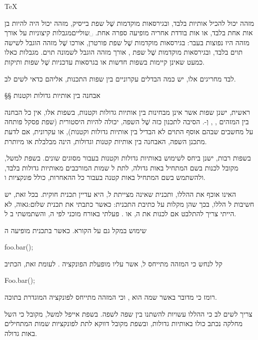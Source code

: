 \begin{english}
\TeX
\end{english}

 מזהה
יכול להכיל אותיות בלבד, ובגירסאות מוקדמות שֶׁל שפת בייסיק, מזהה יכול היה להיות
בן אות אחת בלבד, או אות בודדת אחריה מופיעה ספרה אחת.%
␣שוליים{מגבלות
  קיצוניות על אורך מזהה היו נפוצות בעבר: בגירסאות מוקדמות שֶׁל שפת פורטרן, אורכו שֶׁל
  מזהה הוגבל לשישה תוים בלבד, ובגירסאות מוקדמות שֶׁל שפת , אורך מזהה הוגבל
  לשמונה תוים. מגבלות כאלו כמעט שאינן קיימות בשפות חדשות או בגרסאות עדכניות שֶׁל
שפות ותיקות.}

לבד מחריגים אלו, יש כמה הבדלים עקרוניים בין שפות התכנות, אליהם כדאי לשים לב.

§§ אבחנה בין אותיות גדולות וקטנות

ראשית, ישנן שפות אשר אינן מבחינות בין אותיות גדולות וקטנות, בשפות אלו, אין כל
הבחנה בין המזהים , , וְ-. הסיבה לתכנון כזה שֶׁל
השפה, יכולה להיות היסטורית (שפת פסקל פותחה על מחשבים שבהם אוסף התוים לא הבדיל
בין אותיות גדולות וקטנות), או עקרונית, אם לדעת מתכנן השפה, האבחנה בין אותיות
קטנות וגדולות, הינה מבלבלת או מיותרת.

בשפות רבות, ישנן  ביחס לשימוש באותיות גדולות וקטנות בעבור  מסוגים
שונים. בשפת  למשל, מקובל לכנות  בשם המתחיל באות גדולה, לתת ל
שמות המורכבים מאותיות גדולות בלבד, ולהשתמש בשם המתחיל באות קטנה בעבור
כל ה האחרות, כולל פונקציות ו.

ה אינו אוכף את ה הללו, ותכנית שאינה מצייתת
ל, היא עדיין תכנית חוקית. בכל זאת, יש חשיבות ל
הללו, בכך שהן מקלות על כתיבת התכנית: כאשר כתבתי את
 תכנית שלום:גאוה, לא הייתי צריך להתלבט אם לכנות את
ה , או . פעלתי באורח מוכני
לפי ה, והשתמשתי ב ל.

שימוש ב מקל גם על הקורא. כאשר בתכנית  מופיעה
ה
\begin{Pascal}
foo.bar();
\end{Pascal}
קל לנחש כי המזהה  מתייחס ל, אשר
  עליו מופעלת הפונקציה . לעומת זאת, הכתיב
\begin{PASCAL}
Foo.bar();
\end{PASCAL}
רומז כי מדובר ב אשר שמה הוא , וכי המזהה 
מתייחס לפונקציה  המוגדרת בתוכה.

צריך לשים לב כי ה הללו עשויות להשתנו בין שפה לשפה.
בשפת אייפל למשל, מקובל כי ה של מחלקה נכתב כולו באותיות
גדולות, ובשפת  מקובל דווקא לתת לפונקציות שמות המתחילים באות גדולה.

